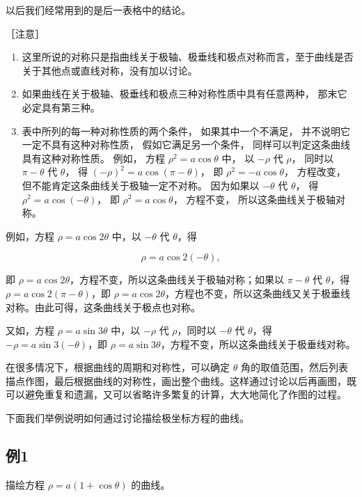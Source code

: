 以后我们经常用到的是后一表格中的结论。

［注意］

\begin{enumerate}
\def\labelenumi{\arabic{enumi}.}
\item
  这里所说的对称只是指曲线关于极轴、极垂线和极点对称而言，至于曲线是否关于其他点或直线对称，没有加以讨论。
\item
  如果曲线在关于极轴、极垂线和极点三种对称性质中具有任意两种，
  那末它必定具有第三种。
\item
  表中所列的每一种对称性质的两个条件， 如果其中一个不满足，
  并不说明它一定不具有这种对称性质， 假如它满足另一个条件，
  同样可以判定这条曲线具有这种对称性质。 例如， 方程
  \(\rho^2 = a \cos \theta\) 中， 以 \(-\rho\) 代 \(\rho\)， 同时以
  \(\pi - \theta\) 代 \(\theta\)， 得
  \((- \rho)^2 = a \cos (\pi - \theta)\)， 即
  \(\rho^2 = -a \cos \theta\)， 方程改变，
  但不能肯定这条曲线关于极轴一定不对称。 因为如果以 \(-\theta\) 代
  \(\theta\)， 得 \(\rho^2 = a \cos (-\theta)\)， 即
  \(\rho^2 = a \cos \theta\)， 方程不变， 所以这条曲线关于极轴对称。
\end{enumerate}

例如，方程 \(\rho = a\cos 2\theta\) 中，以 \(-\theta\) 代 \(\theta\)，得

\[
\rho = a \cos 2 (- \theta),
\]

即 \(\rho = a\cos 2\theta\)，方程不变，所以这条曲线关于极轴对称；如果以
\(\pi -\theta\) 代 \(\theta\)，得 \(\rho = a\cos 2(\pi -\theta)\)，即
\(\rho = a\cos 2\theta\)，方程也不变，所以这条曲线又关于极垂线对称。由此可得，这条曲线关于极点也对称。

又如，方程 \(\rho = a\sin 3\theta\) 中，以 \(-\rho\) 代 \(\rho\)，同时以
\(-\theta\) 代 \(\theta\)，得 \(-\rho = a\sin 3(-\theta)\)，即
\(\rho = a\sin 3\theta\)，方程不变，所以这条曲线关于极垂线对称。

在很多情况下，根据曲线的周期和对称性，可以确定 \(\theta\)
角的取值范围，然后列表描点作图，最后根据曲线的对称性，画出整个曲线。这样通过讨论以后再画图，既可以避免重复和遗漏，又可以省略许多繁复的计算，大大地简化了作图的过程。

下面我们举例说明如何通过讨论描绘极坐标方程的曲线。

\subsection{例1}\label{ux4f8b1-48}

描绘方程 \(\rho = a(1 + \cos\theta)\) 的曲线。


